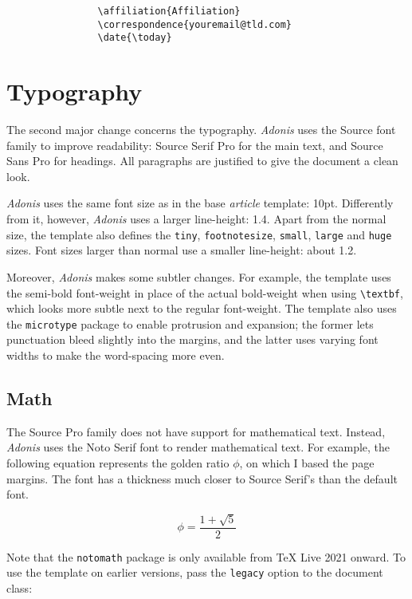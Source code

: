 \documentclass{adonis}
\begin{document}
			\begin{verbatim}
				\affiliation{Affiliation}
				\correspondence{youremail@tld.com}
				\date{\today}
			\end{verbatim}
		
	\section{Typography}
	
		The second major change concerns the typography.
		\textit{Adonis} uses the Source font family to improve readability: Source Serif Pro for the main text, and Source Sans Pro for headings.
		All paragraphs are justified to give the document a clean look.
		
		\textit{Adonis} uses the same font size as in the base \textit{article} template: 10pt.
		Differently from it, however, \textit{Adonis} uses a larger line-height: 1.4.
		Apart from the normal size, the template also defines the \texttt{tiny}, \texttt{footnotesize}, \texttt{small}, \texttt{large} and \texttt{huge} sizes.
		Font sizes larger than normal use a smaller line-height: about 1.2.
		
		Moreover, \textit{Adonis} makes some subtler changes.
		For example, the template uses the semi-bold font-weight in place of the actual bold-weight when using \texttt{\textbackslash{}textbf}, which looks more subtle next to the regular font-weight.
		The template also uses the \texttt{microtype} package to enable protrusion and expansion; the former lets punctuation bleed slightly into the margins, and the latter uses varying font widths to make the word-spacing more even.
		
		\subsection{Math}
		
			The Source Pro family does not have support for mathematical text.
			Instead, \textit{Adonis} uses the Noto Serif font to render mathematical text.
			For example, the following equation represents the golden ratio $\phi$, on which I based the page margins.
			The font has a thickness much closer to Source Serif's than the default font.
		
			\begin{equation}
				\phi = \frac{1 + \sqrt{5}}{2}
			\end{equation}
		
			Note that the \texttt{notomath} package is only available from TeX Live 2021 onward.
			To use the template on earlier versions, pass the \texttt{legacy} option to the document class:
			
\end{document}
